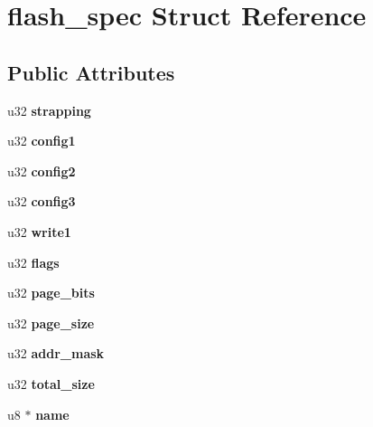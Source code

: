 \hypertarget{structflash__spec}{
\section{flash\_\-spec Struct Reference}
\label{structflash__spec}
}
\subsection*{Public Attributes}
\begin{DoxyCompactItemize}
\item 
\hypertarget{structflash__spec_a6322dd02a51dcc5b6cebc42829ac2f06}{
u32 {\bfseries strapping}}
\label{structflash__spec_a6322dd02a51dcc5b6cebc42829ac2f06}

\item 
\hypertarget{structflash__spec_a4684202cb9fb12e21179154e6b834bc3}{
u32 {\bfseries config1}}
\label{structflash__spec_a4684202cb9fb12e21179154e6b834bc3}

\item 
\hypertarget{structflash__spec_a3979883e8b83c930a3dec16625f2b2d7}{
u32 {\bfseries config2}}
\label{structflash__spec_a3979883e8b83c930a3dec16625f2b2d7}

\item 
\hypertarget{structflash__spec_aacc7ad285eb28f9db36b91685cb06b8e}{
u32 {\bfseries config3}}
\label{structflash__spec_aacc7ad285eb28f9db36b91685cb06b8e}

\item 
\hypertarget{structflash__spec_a97e8ea28b82044df1521b1e423162883}{
u32 {\bfseries write1}}
\label{structflash__spec_a97e8ea28b82044df1521b1e423162883}

\item 
\hypertarget{structflash__spec_a08402ce4e4ee665fa19d9ff436eef250}{
u32 {\bfseries flags}}
\label{structflash__spec_a08402ce4e4ee665fa19d9ff436eef250}

\item 
\hypertarget{structflash__spec_a990a0546dc23569276959a8b7f834818}{
u32 {\bfseries page\_\-bits}}
\label{structflash__spec_a990a0546dc23569276959a8b7f834818}

\item 
\hypertarget{structflash__spec_a9096c667924e09f3ab03a13917e481e5}{
u32 {\bfseries page\_\-size}}
\label{structflash__spec_a9096c667924e09f3ab03a13917e481e5}

\item 
\hypertarget{structflash__spec_a2106223af91b09bbd12cb76911b5ce69}{
u32 {\bfseries addr\_\-mask}}
\label{structflash__spec_a2106223af91b09bbd12cb76911b5ce69}

\item 
\hypertarget{structflash__spec_a22c7cc4c61635f07ffe7e7eb31bdd164}{
u32 {\bfseries total\_\-size}}
\label{structflash__spec_a22c7cc4c61635f07ffe7e7eb31bdd164}

\item 
\hypertarget{structflash__spec_a11effd54e78e43e918ea4d654507a210}{
u8 $\ast$ {\bfseries name}}
\label{structflash__spec_a11effd54e78e43e918ea4d654507a210}

\end{DoxyCompactItemize}


